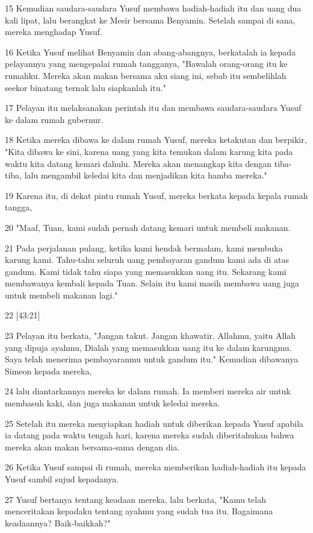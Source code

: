 \par 15 Kemudian saudara-saudara Yusuf membawa hadiah-hadiah itu dan uang dua kali lipat, lalu berangkat ke Mesir bersama Benyamin. Setelah sampai di sana, mereka menghadap Yusuf.
\par 16 Ketika Yusuf melihat Benyamin dan abang-abangnya, berkatalah ia kepada pelayannya yang mengepalai rumah tangganya, "Bawalah orang-orang itu ke rumahku. Mereka akan makan bersama aku siang ini, sebab itu sembelihlah seekor binatang ternak lalu siapkanlah itu."
\par 17 Pelayan itu melaksanakan perintah itu dan membawa saudara-saudara Yusuf ke dalam rumah gubernur.
\par 18 Ketika mereka dibawa ke dalam rumah Yusuf, mereka ketakutan dan berpikir, "Kita dibawa ke sini, karena uang yang kita temukan dalam karung kita pada waktu kita datang kemari dahulu. Mereka akan menangkap kita dengan tiba-tiba, lalu mengambil keledai kita dan menjadikan kita hamba mereka."
\par 19 Karena itu, di dekat pintu rumah Yusuf, mereka berkata kepada kepala rumah tangga,
\par 20 "Maaf, Tuan, kami sudah pernah datang kemari untuk membeli makanan.
\par 21 Pada perjalanan pulang, ketika kami hendak bermalam, kami membuka karung kami. Tahu-tahu seluruh uang pembayaran gandum kami ada di atas gandum. Kami tidak tahu siapa yang memasukkan uang itu. Sekarang kami membawanya kembali kepada Tuan. Selain itu kami masih membawa uang juga untuk membeli makanan lagi."
\par 22 [43:21]
\par 23 Pelayan itu berkata, "Jangan takut. Jangan khawatir. Allahmu, yaitu Allah yang dipuja ayahmu, Dialah yang memasukkan uang itu ke dalam karungmu. Saya telah menerima pembayaranmu untuk gandum itu." Kemudian dibawanya Simeon kepada mereka,
\par 24 lalu diantarkannya mereka ke dalam rumah. Ia memberi mereka air untuk membasuh kaki, dan juga makanan untuk keledai mereka.
\par 25 Setelah itu mereka menyiapkan hadiah untuk diberikan kepada Yusuf apabila ia datang pada waktu tengah hari, karena mereka sudah diberitahukan bahwa mereka akan makan bersama-sama dengan dia.
\par 26 Ketika Yusuf sampai di rumah, mereka memberikan hadiah-hadiah itu kepada Yusuf sambil sujud kepadanya.
\par 27 Yusuf bertanya tentang keadaan mereka, lalu berkata, "Kamu telah menceritakan kepadaku tentang ayahmu yang sudah tua itu. Bagaimana keadaannya? Baik-baikkah?"
